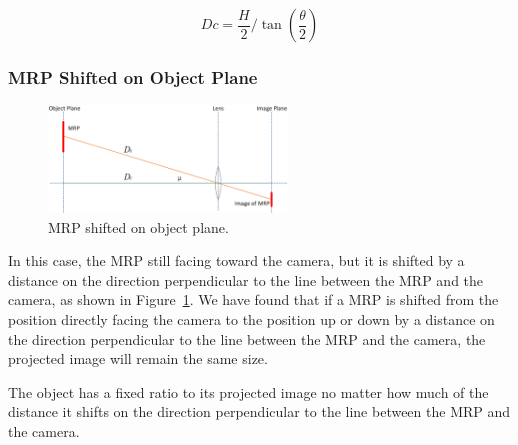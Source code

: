\[Dc = \frac{H}{2}/\tan (\frac{\theta }{2})\]

\subsubsection{MRP Shifted on Object Plane}
\begin{figure}
  \vspace{-20pt}
  \begin{center}
    \includegraphics[width=2.5in]{fig/fig-distance-case2.eps}
  \end{center}
  \vspace{-20pt}
  \caption{MRP shifted on object plane.}\label{fig-distance-case2}
  \vspace{-20pt}
\end{figure}
In this case, the MRP still facing toward the camera, but it is shifted by a distance on the direction perpendicular to the line between the MRP and the camera, as shown in Figure~\ref{fig-distance-case2}. We have found that if a MRP is shifted from the position directly facing the camera to the position up or down by a distance on the direction perpendicular to the line between the MRP and the camera, the projected image will remain the same size.

\begin{theorem}
The object has a fixed ratio to its projected image no matter how much of the distance it shifts on the direction perpendicular to the line between the MRP and the camera.
\end{theorem}

